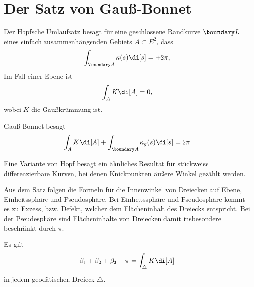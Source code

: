 \section{Der Satz von Gauß-Bonnet}


Der Hopfsche Umlaufsatz besagt für eine geschlossene Randkurve $\boundary L$ eines einfach zusammenhängenden Gebiets $A \subset E^2$, dass
\[
	\int_{\boundary A} \kappa(s) \di[s] = + 2\pi,
\]
Im Fall einer Ebene ist
\[
	\int_A K \di[A] = 0,
\]
wobei $K$ die Gaußkrümmung ist.

Gauß-Bonnet besagt
\[
	\int_A K \di[A] + \int_{\boundary A} \kappa_g(s) \di[s] = 2 \pi
\]

Eine Variante von Hopf besagt ein ähnliches Resultat für stückweise differenzierbare Kurven, bei denen Knickpunkten äußere Winkel gezählt werden.

\begin{ex}
	Aus dem Satz folgen die Formeln für die Innenwinkel von Dreiecken auf Ebene, Einheitssphäre und Pseudosphäre.
	Bei Einheitssphäre und Pseudosphäre kommt es zu Exzess, bzw. Defekt, welcher dem Flächeninhalt des Dreiecks entspricht.
	Bei der Pseudesphäre sind Flächeninhalte von Dreiecken damit insbesondere beschränkt durch $\pi$.
\end{ex}

\begin{thm}
	Es gilt
	\[
		\beta_1 + \beta_2 + \beta_3 - \pi = \int_{\triangle} K \di[A]
	\]
	in jedem geodätischen Dreieck $\triangle$.
\end{thm}




